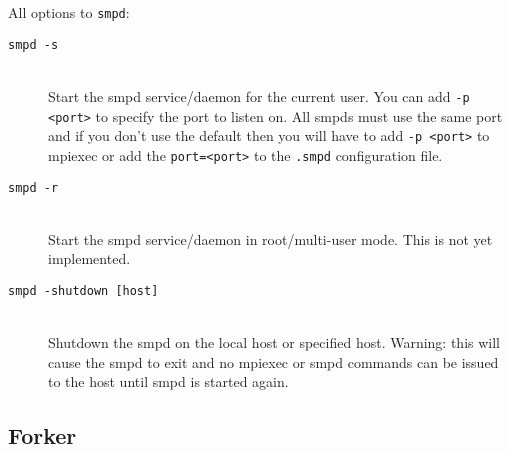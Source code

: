 \documentclass[dvipdfm,11pt]{article}
\begin{document}
All options to \texttt{smpd}:

\begin{description}
\item[\texttt{smpd -s}]\mbox{}\\
Start the smpd service/daemon for the current user.  You can add 
\texttt{-p <port>} to specify the port to listen on.  All smpds must use
the same port and if you don't use the default then you will have to
add \texttt{-p <port>} to mpiexec or add the \texttt{port=<port>} to the 
\texttt{.smpd} configuration file.

\item[\texttt{smpd -r}]\mbox{}\\
Start the smpd service/daemon in root/multi-user mode.  This is not yet
implemented.

\item[\texttt{smpd -shutdown [host]}]\mbox{}\\
Shutdown the smpd on the local host or specified host.  Warning: this will
cause the smpd to exit and no mpiexec or smpd commands can be issued to the
host until smpd is started again.

%
%

\end{description}

\subsection{Forker}
\label{sec:forker}
\end{document}
